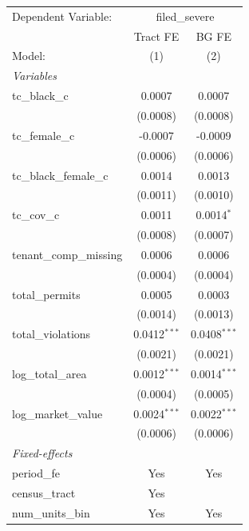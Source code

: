 \begin{tabular}{lcc}
   \tabularnewline \midrule \midrule
   Dependent Variable: & \multicolumn{2}{c}{filed\_severe}\\
                           & Tract FE       & BG FE \\   
   Model:                  & (1)            & (2)\\  
   \midrule
   \emph{Variables}\\
   tc\_black\_c            & 0.0007         & 0.0007\\   
                           & (0.0008)       & (0.0008)\\   
   tc\_female\_c           & -0.0007        & -0.0009\\   
                           & (0.0006)       & (0.0006)\\   
   tc\_black\_female\_c    & 0.0014         & 0.0013\\   
                           & (0.0011)       & (0.0010)\\   
   tc\_cov\_c              & 0.0011         & 0.0014$^{*}$\\   
                           & (0.0008)       & (0.0007)\\   
   tenant\_comp\_missing   & 0.0006         & 0.0006\\   
                           & (0.0004)       & (0.0004)\\   
   total\_permits          & 0.0005         & 0.0003\\   
                           & (0.0014)       & (0.0013)\\   
   total\_violations       & 0.0412$^{***}$ & 0.0408$^{***}$\\   
                           & (0.0021)       & (0.0021)\\   
   log\_total\_area        & 0.0012$^{***}$ & 0.0014$^{***}$\\   
                           & (0.0004)       & (0.0005)\\   
   log\_market\_value      & 0.0024$^{***}$ & 0.0022$^{***}$\\   
                           & (0.0006)       & (0.0006)\\   
   \midrule
   \emph{Fixed-effects}\\
   period\_fe              & Yes            & Yes\\  
   census\_tract           & Yes            & \\  
   num\_units\_bin         & Yes            & Yes\\  

\end{tabular}
